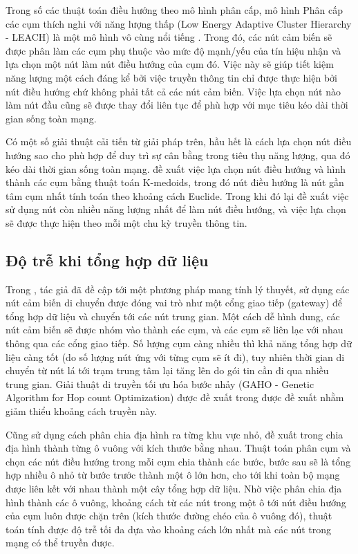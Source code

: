 Trong số các thuật toán điều hướng theo mô hình phân cấp, mô hình Phân cấp các cụm thích nghi với năng lượng thấp (Low Energy Adaptive Cluster Hierarchy - LEACH) là một mô hình vô cùng nổi tiếng \cite{heinzelman2000energy}. Trong đó, các nút cảm biến sẽ được phân làm các cụm phụ thuộc vào mức độ mạnh/yếu của tín hiệu nhận và lựa chọn một nút làm nút điều hướng của cụm đó. Việc này sẽ giúp tiết kiệm năng lượng một cách đáng kể bởi việc truyền thông tin chỉ được thực hiện bởi nút điều hướng chứ không phải tất cả các nút cảm biến. Việc lựa chọn nút nào làm nút đầu cũng sẽ được thay đổi liên tục để phù hợp với mục tiêu kéo dài thời gian sống toàn mạng.


Có một số giải thuật cải tiến từ giải pháp trên, hầu hết là cách lựa chọn nút điều hướng sao cho phù hợp để duy trì sự cân bằng trong tiêu thụ năng lượng, qua đó kéo dài thời gian sống toàn mạng. \cite{bakaraniya2013k} đề xuất việc lựa chọn nút điều hướng và hình thành các cụm bằng thuật toán K-medoids, trong đó nút điều hướng là nút gần tâm cụm nhất tính toán theo khoảng cách Euclide. Trong khi đó \cite{arumugam2015ee} lại đề xuất việc sử dụng nút còn nhiều năng lượng nhất để làm nút điều hướng, và việc lựa chọn sẽ được thực hiện theo mỗi một chu kỳ truyền thông tin.

\subsection{Độ trễ khi tổng hợp dữ liệu}
Trong \cite{youssef2007intelligent}, tác giả đã đề cập tới một phương pháp mang tính lý thuyết, sử dụng các nút cảm biến di chuyển được đóng vai trò như một cổng giao tiếp (gateway) để tổng hợp dữ liệu và chuyển tới các nút trung gian. Một cách dễ hình dung, các nút cảm biến sẽ được nhóm vào thành các cụm, và các cụm sẽ liên lạc với nhau thông qua các cổng giao tiếp. Số lượng cụm càng nhiều thì khả năng tổng hợp dữ liệu càng tốt (do số lượng nút ứng với từng cụm sẽ ít đi), tuy nhiên thời gian di chuyển từ nút lá tới trạm trung tâm lại tăng lên do gói tin cần đi qua nhiều trung gian. Giải thuật di truyền tối ưu hóa bước nhảy (GAHO - Genetic Algorithm for Hop count Optimization) được đề xuất trong \cite{youssef2007intelligent} được đề xuất nhằm giảm thiểu khoảng cách truyền này.


Cũng sử dụng cách phân chia địa hình ra từng khu vực nhỏ, đề xuất trong \cite{wang2012minimizing} chia địa hình thành từng ô vuông với kích thước bằng nhau. Thuật toán phân cụm và chọn các nút điều hướng trong mỗi cụm chia thành các bước, bước sau sẽ là tổng hợp nhiều ô nhỏ từ bước trước thành một ô lớn hơn, cho tới khi toàn bộ mạng được liên kết với nhau thành một cây tổng hợp dữ liệu. Nhờ việc phân chia địa hình thành các ô vuông, khoảng cách từ các nút trong một ô tới nút điều hướng của cụm luôn được chặn trên (kích thước đường chéo của ô vuông đó), thuật toán tính được độ trễ tối đa dựa vào khoảng cách lớn nhất mà các nút trong mạng có thể truyền được.


